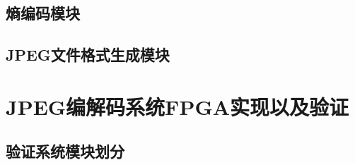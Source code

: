 \documentclass{article}
\numberwithin {equation}{section}
\begin{document}
\begin{spacing}{1.25}
  \subsection{熵编码模块}
    \vspace{1em}
  \subsection{JPEG文件格式生成模块}
    \vspace{1em}

\newpage
\section{JPEG编解码系统FPGA实现以及验证}
  \subsection{验证系统模块划分}

\end{spacing}
\end{document}
